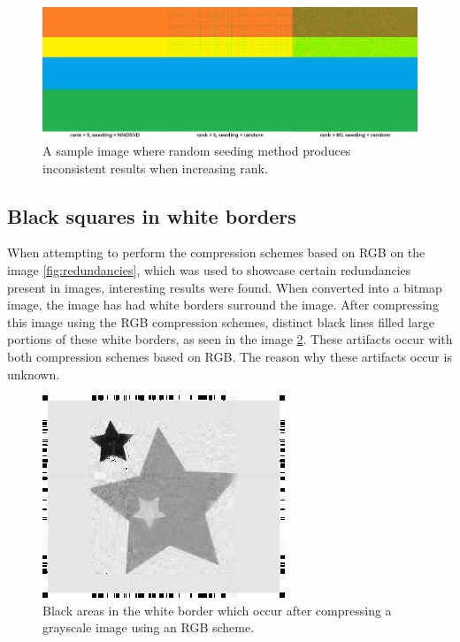 \documentclass[thesis=M,english]{FITthesis}[2012/10/20]
\begin{document}
\begin{figure}[h]
  \centering
  \includegraphics[scale=0.5]{imgs/random-seed-artifacts}
  \caption{A sample image where random seeding method produces inconsistent results
           when increasing rank.}
  \label{fig:random-seed}
\end{figure}


\subsection{Black squares in white borders}
When attempting to perform the compression schemes based on RGB on the image
\ref{fig:redundancies}, which was used to showcase certain redundancies present
in images, interesting results were found. When converted into a bitmap image,
the image has had white borders surround the image. After compressing this image
using the RGB compression schemes, distinct black lines filled large portions of these
white borders, as seen in the image \ref{fig:blacksquares}. These artifacts occur with
both compression schemes based on RGB. The reason why these artifacts occur is unknown.

\begin{figure}[h]
  \centering
  \includegraphics[scale=0.65]{imgs/redundancies_black_border}
  \caption{Black areas in the white border which occur after compressing a grayscale image
  		  using an RGB scheme.}
  \label{fig:blacksquares}
\end{figure}
\end{document}

